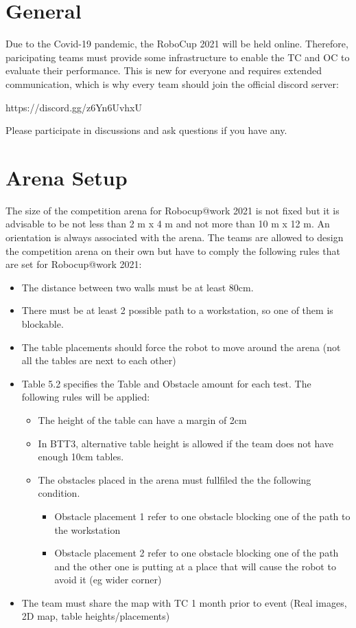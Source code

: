 
\section{General} 
\label{sec:General}

Due to the Covid-19 pandemic, the RoboCup 2021 will be held online. 
Therefore, paricipating teams must provide some infrastructure to enable the TC and OC to evaluate their performance.
This is new for everyone and requires extended communication, which is why every team should join the official discord server:

https://discord.gg/z6Yn6UvhxU

Please participate in discussions and ask questions if you have any.

\section{Arena Setup} 
\label{sec:VRCArenaSetup}

The size of the competition arena for Robocup@work 2021 is not fixed but it is advisable to be not less than 2 m x 4 m and not more than 10 m x 12 m. An orientation is always associated with the arena. The teams are allowed to design the competition arena on their own but have to comply the following rules that are set for Robocup@work 2021:
\begin{itemize}
\item The distance between two walls must be at least 80cm. 
\item There must be at least 2 possible path to a workstation, so one of them is blockable.
\item The table placements should force the robot to move around the arena (not all the tables are next to each other)
\item Table 5.2 specifies the Table and Obstacle amount for each test. The following rules will be applied:
	\begin{itemize}
		\item The height of the table can have a margin of 2cm
		\item In BTT3, alternative table height is allowed if the team does not have enough 10cm tables.
		\item The obstacles placed in the arena must fullfiled the the following condition. 
			\begin{itemize}
				\item Obstacle placement 1 refer to one obstacle blocking one of the path to the workstation
				\item Obstacle placement 2 refer to one obstacle blocking one of the path and the other one is putting at a place that will cause the robot to avoid it (eg wider corner)
			\end{itemize}
	\end{itemize}
\item The team must share the map with TC 1 month prior to event (Real images, 2D map, table heights/placements)
\end{itemize}

